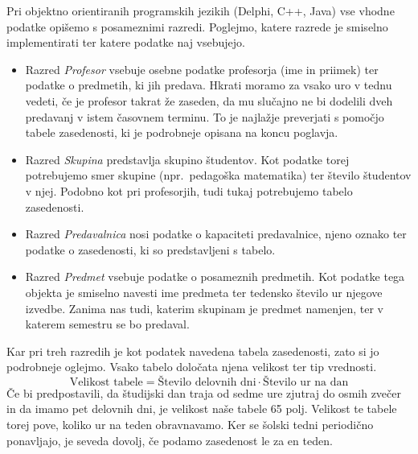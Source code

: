 \documentclass[a4paper, 10pt]{article}
\begin{document}
Pri objektno orientiranih programskih jezikih (Delphi, C++, Java) vse vhodne podatke
opišemo s posameznimi razredi. Poglejmo, katere razrede je smiselno implementirati ter
katere podatke naj vsebujejo.



   \begin{itemize}
   \item Razred \emph{Profesor} vsebuje osebne podatke profesorja (ime in priimek) ter
   podatke o predmetih, ki jih predava. Hkrati moramo za vsako uro v tednu vedeti, če
   je profesor takrat že zaseden, da mu slučajno ne bi dodelili dveh predavanj v istem
   časovnem terminu. To je najlažje preverjati s pomočjo tabele zasedenosti, ki je
   podrobneje opisana na koncu poglavja.
   \item Razred \emph{Skupina} predstavlja skupino študentov. Kot podatke torej potrebujemo
   smer skupine (npr.\ pedagoška matematika) ter število študentov v njej. Podobno kot pri
   profesorjih, tudi tukaj potrebujemo tabelo zasedenosti.
   \item Razred \emph{Predavalnica} nosi podatke o kapaciteti predavalnice, njeno oznako
   ter podatke o zasedenosti, ki so predstavljeni s tabelo.
   \item Razred \emph{Predmet} vsebuje podatke o posameznih predmetih. Kot podatke tega
   objekta je smiselno navesti ime predmeta ter tedensko število ur njegove izvedbe.
   Zanima nas tudi, katerim skupinam je predmet namenjen, ter v katerem semestru se bo
   predaval. 
   \end{itemize}

\noindent Kar pri treh razredih je kot podatek navedena tabela zasedenosti, zato si jo podrobneje
oglejmo. Vsako tabelo določata njena velikost ter tip vrednosti.
\[
\text{Velikost tabele} = \text{Število delovnih dni} \cdot \text{Število ur na dan}
\]
Če bi predpostavili, da študijski dan traja od sedme ure zjutraj do osmih zvečer in da
imamo pet delovnih dni, je velikost naše tabele 65 polj. Velikost te tabele torej pove,
koliko ur na teden obravnavamo. Ker se šolski tedni periodično ponavljajo, je seveda
dovolj, če podamo zasedenost le za en teden.
\end{document}
